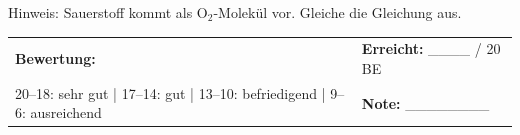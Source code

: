 \documentclass[11pt, a4paper]{article}
\begin{document}
\vspace{0.5em}
{\small Hinweis: Sauerstoff kommt als O$_2$-Molekül vor. Gleiche die Gleichung aus.}

\vspace{1.5em}


\begin{tcolorbox}[colback=hellgrau, colframe=hellgrau, boxrule=0pt, arc=0pt, left=8pt, right=8pt, top=4pt, bottom=4pt]
\small
\begin{tabular}{@{}p{10cm}p{4cm}@{}}
\textbf{Bewertung:} & \textbf{Erreicht:} \_\_\_\_ / 20 BE \\[0.3em]
20--18: sehr gut | 17--14: gut | 13--10: befriedigend | 9--6: ausreichend & \textbf{Note:} \_\_\_\_\_\_\_\_
\end{tabular}
\end{tcolorbox}
\end{document}
